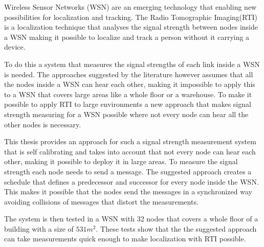 Wireless Sensor Networks (WSN) are an emerging technology that enabling new possibilities for localization and tracking. The Radio Tomographic Imaging(RTI) is a localization technique that analyses the signal strength between nodes inside a WSN making it possible to localize and track a person without it carrying a device.

To do this a system that measures the signal strengths of each link inside a WSN is needed. The approaches suggested by the literature however assumes that all the nodes inside a WSN can hear each other, making it impossible to apply this to a WSN that covers large areas like a whole floor or a warehouse.
To make it possible to apply RTI to large environments a new approach that makes signal strength measuring for a WSN possible where not every node can hear all the other nodes is necessary. 

This thesis provides an approach for such a signal strength measurement system that is self calibrating and takes into account that not every node can hear each other, making it possible to deploy it in large areas. To measure the signal strength each node needs to send a message. The suggested approach creates a schedule that defines a predecessor and successor for every node inside the WSN. This makes it possible that the nodes send the messages in a synchronized way avoiding collisions of messages that distort the measurements.

The system is then tested in a WSN with 32 nodes that covers a whole floor of a building with a size of $531 m^2$. These tests show that the the suggested approach can take measurements quick enough to make localization with RTI possible.
\cleardoublepage
